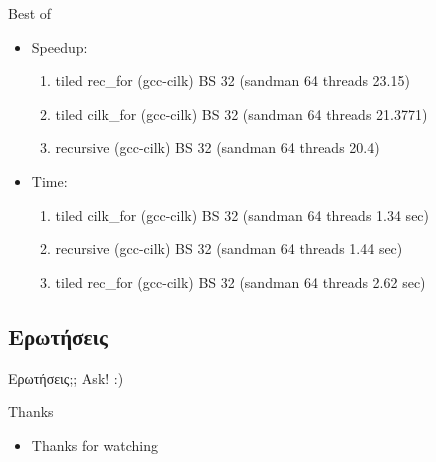 \documentclass{beamer}
\begin{document}
\begin{frame}
    \begin{block}{Best of}
    \begin{itemize}
        \item<1-> Speedup:
            \begin{enumerate}
                \item<2-> tiled rec\_for (gcc-cilk) BS 32 (sandman 64 threads 23.15)
                \item<3-> tiled cilk\_for (gcc-cilk) BS 32 (sandman 64 threads 21.3771)
                \item<4-> recursive (gcc-cilk) BS 32 (sandman 64 threads 20.4)
            \end{enumerate}
        \item<5-> Time:
            \begin{enumerate}
                \item<6-> tiled cilk\_for (gcc-cilk) BS 32 (sandman 64 threads 1.34 sec)
                \item<7-> recursive (gcc-cilk) BS 32 (sandman 64 threads 1.44 sec)
                \item<8-> tiled rec\_for (gcc-cilk) BS 32 (sandman 64 threads 2.62 sec)
            \end{enumerate}
    \end{itemize}
    \end{block}
\end{frame}


\subsection{Ερωτήσεις}
\begin{frame}{Ερωτήσεις;;}
    Ask! :)
\end{frame}

\begin{frame}{Thanks}
    \begin{itemize}
        \item Thanks for watching
    \end{itemize}
\end{frame}
\end{document}
